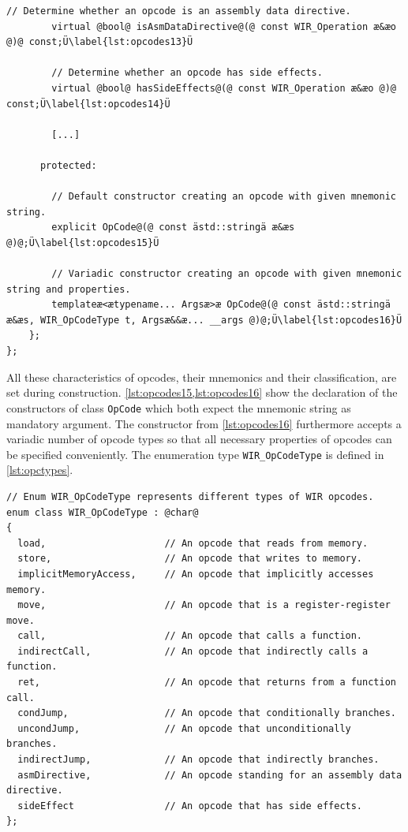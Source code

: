 \begin{lstlisting}[style=code,float=!ht,caption={Generic Opcode Handling of Class \texttt{WIR\_BaseProcessor}},label=lst:opcodes]
        // Determine whether an opcode is an assembly data directive.
        virtual @bool@ isAsmDataDirective@(@ const WIR_Operation æ&æo @)@ const;Ü\label{lst:opcodes13}Ü

        // Determine whether an opcode has side effects.
        virtual @bool@ hasSideEffects@(@ const WIR_Operation æ&æo @)@ const;Ü\label{lst:opcodes14}Ü

        [...]

      protected:

        // Default constructor creating an opcode with given mnemonic string.
        explicit OpCode@(@ const ästd::stringä æ&æs @)@;Ü\label{lst:opcodes15}Ü

        // Variadic constructor creating an opcode with given mnemonic string and properties.
        templateæ<ætypename... Argsæ>æ OpCode@(@ const ästd::stringä æ&æs, WIR_OpCodeType t, Argsæ&&æ... __args @)@;Ü\label{lst:opcodes16}Ü
    };
};
\end{lstlisting}

\clearpage

All these characteristics of opcodes, their mnemonics and their classification, are set during construction.
\cref{lst:opcodes15,lst:opcodes16} show the declaration of the constructors of class \texttt{OpCode} which both expect the mnemonic string as mandatory argument.
The constructor from \cref{lst:opcodes16} furthermore accepts a variadic number of opcode types so that all necessary properties of opcodes can be specified conveniently.
The enumeration type \texttt{WIR\_OpCodeType} is defined in \cref{lst:opctypes}.

\begin{lstlisting}[style=code,float=t,caption={Classification of Opcodes by Type \texttt{WIR\_OpCodeType}},label=lst:opctypes]
// Enum WIR_OpCodeType represents different types of WIR opcodes.
enum class WIR_OpCodeType : @char@
{
  load,                     // An opcode that reads from memory.
  store,                    // An opcode that writes to memory.
  implicitMemoryAccess,     // An opcode that implicitly accesses memory.
  move,                     // An opcode that is a register-register move.
  call,                     // An opcode that calls a function.
  indirectCall,             // An opcode that indirectly calls a function.
  ret,                      // An opcode that returns from a function call.
  condJump,                 // An opcode that conditionally branches.
  uncondJump,               // An opcode that unconditionally branches.
  indirectJump,             // An opcode that indirectly branches.
  asmDirective,             // An opcode standing for an assembly data directive.
  sideEffect                // An opcode that has side effects.
};
\end{lstlisting}

